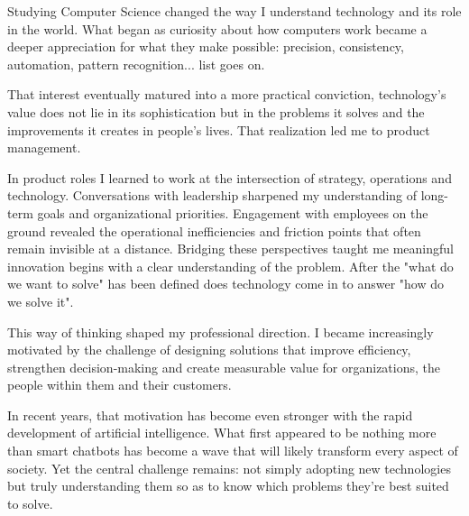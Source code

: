 \documentclass[11pt, a4paper]{awesome-cv}
\begin{document}
\makecvheader[R]

\makecvfooter
  {}
  {}
  {}

\makelettertitle

\begin{cvletter}

Studying Computer Science changed the way I understand technology and its role in the world. What began as curiosity about how computers work became a deeper appreciation for what they make possible: precision, consistency, automation, pattern recognition... list goes on.

That interest eventually matured into a more practical conviction, technology's value does not lie in its sophistication but in the problems it solves and the improvements it creates in people's lives. That realization led me to product management.

In product roles I learned to work at the intersection of strategy, operations and technology. Conversations with leadership sharpened my understanding of long-term goals and organizational priorities. Engagement with employees on the ground revealed the operational inefficiencies and friction points that often remain invisible at a distance. Bridging these perspectives taught me meaningful innovation begins with a clear understanding of the problem. After the "what do we want to solve" has been defined does technology come in to answer "how do we solve it".

This way of thinking shaped my professional direction. I became increasingly motivated by the challenge of designing solutions that improve efficiency, strengthen decision-making and create measurable value for organizations, the people within them and their customers.

In recent years, that motivation has become even stronger with the rapid development of artificial intelligence. What first appeared to be nothing more than smart chatbots has become a wave that will likely transform every aspect of society. Yet the central challenge remains: not simply adopting new technologies but truly understanding them so as to know which problems they're best suited to solve.


\end{cvletter}
\end{document}
